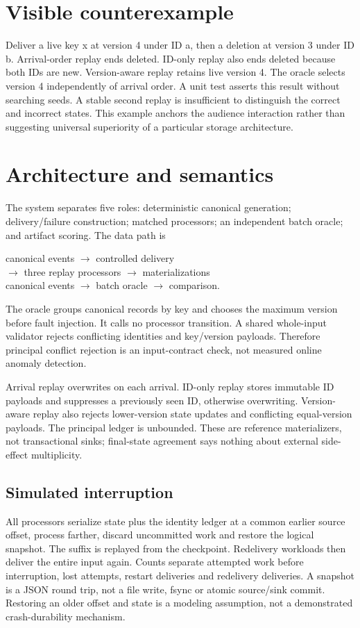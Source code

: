 \documentclass[10pt,twocolumn]{article}
\begin{document}
\section{Visible counterexample}
Deliver a live key x at version 4 under ID a, then a deletion at version 3 under
ID b. Arrival-order replay ends deleted. ID-only replay also ends deleted because
both IDs are new. Version-aware replay retains live version 4. The oracle selects
version 4 independently of arrival order. A unit test asserts this result without
searching seeds. A stable second replay is insufficient to distinguish the correct
and incorrect states. This example anchors the audience interaction rather than
suggesting universal superiority of a particular storage architecture.
\clearpage
\section{Architecture and semantics}
The system separates five roles: deterministic canonical generation; delivery/failure
construction; matched processors; an independent batch oracle; and artifact scoring.
The data path is
\begin{center}
canonical events $\rightarrow$ controlled delivery\\
$\rightarrow$ three replay processors $\rightarrow$ materializations\\
canonical events $\rightarrow$ batch oracle $\rightarrow$ comparison.
\end{center}
The oracle groups canonical records by key and chooses the maximum version before
fault injection. It calls no processor transition. A shared whole-input validator
rejects conflicting identities and key/version payloads. Therefore principal conflict
rejection is an input-contract check, not measured online anomaly detection.

Arrival replay overwrites on each arrival. ID-only replay stores immutable ID payloads
and suppresses a previously seen ID, otherwise overwriting. Version-aware replay also
rejects lower-version state updates and conflicting equal-version payloads. The
principal ledger is unbounded. These are reference materializers, not transactional
sinks; final-state agreement says nothing about external side-effect multiplicity.

\subsection{Simulated interruption}
All processors serialize state plus the identity ledger at a common earlier source
offset, process farther, discard uncommitted work and restore the logical snapshot.
The suffix is replayed from the checkpoint. Redelivery workloads then deliver the
entire input again. Counts separate attempted work before interruption, lost attempts,
restart deliveries and redelivery deliveries. A snapshot is a JSON round trip, not
a file write, fsync or atomic source/sink commit. Restoring an older offset and state
is a modeling assumption, not a demonstrated crash-durability mechanism.
\end{document}
